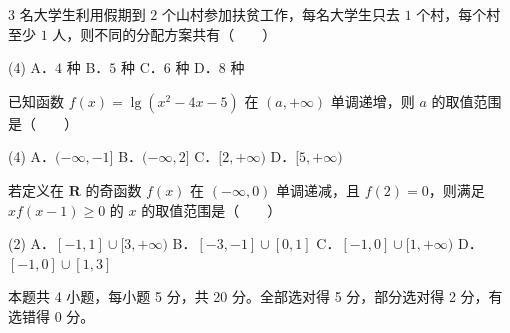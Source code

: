 \begin{question}
$3$ 名大学生利用假期到 $2$ 个山村参加扶贫工作，每名大学生只去 $1$ 个村，每个村至少 $1$ 人，则不同的分配方案共有\mbox{（　　）}

\begin{gkopts}(4)
\task A．$4$ 种
\task B．$5$ 种
\task C．$6$ 种
\task D．$8$ 种
\end{gkopts}

\end{question}
\begin{question}
已知函数 $f(x)=\lg\left(x^{2}-4x-5\right)$ 在 $(a,+\infty)$ 单调递增，则 $a$ 的取值范围是\mbox{（　　）}

\begin{gkopts}(4)
\task A．$(-\infty,-1]$
\task B．$(-\infty,2]$
\task C．$[2,+\infty)$
\task D．$[5,+\infty)$
\end{gkopts}

\end{question}
\begin{question}
若定义在 $\mathbf R$ 的奇函数 $f(x)$ 在 $(-\infty,0)$ 单调递减，且 $f(2)=0$，则满足 $xf(x-1)\ge0$ 的 $x$ 的取值范围是\mbox{（　　）}

\begin{gkopts}(2)
\task A．$[-1,1]\cup[3,+\infty)$
\task B．$[-3,-1]\cup[0,1]$
\task C．$[-1,0]\cup[1,+\infty)$
\task D．$[-1,0]\cup[1,3]$
\end{gkopts}

\par\medskip

\end{question}

\begin{gktip}
本题共 4 小题，每小题 5 分，共 20 分。全部选对得 5 分，部分选对得 2 分，有选错得 0 分。
\end{gktip}

